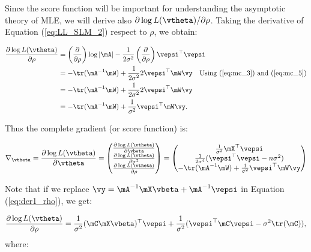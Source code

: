 \documentclass[english,12pt]{book}\usepackage[]{graphicx}\usepackage[]{xcolor}
\begin{document}
Since the score function will be important for understanding the asymptotic theory of MLE, we will derive also $\partial \log L(\vtheta) / \partial \rho$. Taking the derivative of Equation (\ref{eq:LL_SLM_2}) respect to $\rho$, we obtain:

\begin{equation}\label{eq:der1_rho}
  \begin{aligned}
      \frac{\partial \log L(\vtheta)}{\partial \rho} & =  \left(\frac{\partial}{\partial \rho}\right)\log \left| \mA\right| -  \frac{1}{2\sigma^2}\left(\frac{\partial}{\partial \rho}\right)\vepsi^\top \vepsi \\
      & = - \tr(\mA^{-1}\mW) +\frac{1}{2\sigma^2}2\vepsi^\top\mW\vy\quad\mbox{Using (\ref{eq:mc_3}) and (\ref{eq:mc_5})} \\
      & = - \tr(\mA^{-1}\mW) +\frac{1}{2\sigma^2}2\vepsi^\top\mW\vy \\
      & = - \tr(\mA^{-1}\mW) +\frac{1}{\sigma^2}\vepsi^\top\mW\vy. 
  \end{aligned}
\end{equation}

Thus the complete gradient (or score function) is:

\begin{equation}\label{eq:full_agradient}
  \nabla_{\vtheta} = \frac{\partial \log L(\vtheta)}{\partial \vtheta} = 
    \begin{pmatrix}
    \frac{\partial \log L(\vtheta)}{\partial \vbeta} \\
    \frac{\partial \log L(\vtheta)}{\partial \sigma^2} \\
    \frac{\partial \log L(\vtheta)}{\partial \rho}
    \end{pmatrix}
    =
    \begin{pmatrix}
    \frac{1}{\sigma^2}\mX^\top\vepsi \\
    \frac{1}{2\sigma^4}(\vepsi^\top\vepsi-n\sigma^2) \\
    - \tr(\mA^{-1}\mW) +\frac{1}{\sigma^2}\vepsi^\top\mW\vy
    \end{pmatrix}
\end{equation}

Note that if we replace $\vy = \mA^{-1}\mX\vbeta + \mA^{-1}\vepsi$ in Equation (\ref{eq:der1_rho}), we get:

\begin{equation*}
 \frac{\partial \log L(\vtheta)}{\partial \rho} = \frac{1}{\sigma^2}(\mC\mX\vbeta)^\top \vepsi + \frac{1}{\sigma^2}(\vepsi^\top\mC\vepsi - \sigma^2 \tr(\mC)),
\end{equation*}
%
where:
\end{document}
